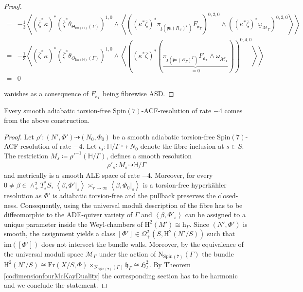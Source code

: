 \documentclass[psamsfonts]{amsart}
\theoremstyle{plain}
\theoremstyle{definition}{
\newtheorem{defi}{Definition}[section]
\newtheorem{ass}{Assumption}
\newtheorem*{nota}{Notation}}
\theoremstyle{remark}{
\newtheorem{rem}{Remark}
\newtheorem{ex}{Example}}
\theoremstyle{plain}{
\newtheorem{thm}{Theorem}[section]
\newtheorem{lem}{Lemma}[section]
\newtheorem{cor}{Corollary}[section]
\newtheorem{prop}{Proposition}[section]
\newtheorem{con}{Conjecture}[section]}
\newcommand{\m}[1]{{\mathrm{#1}}}
\begin{document}
\begin{proof}
\begin{align*}
    =&-\frac{1}{3}\left<(\overline{\zeta}^*\kappa)^*(\overline{\zeta}^*\theta_{\Theta_{\m{Im}(\mathbb{H})}(\Gamma)})^{1,0}\wedge\left<((\kappa^*\overline{\zeta})^*\pi_{\mathfrak{z}(\mathfrak{pu}(R_\Gamma)^{\Gamma})}F_{\mathfrak{a}_\Gamma})^{0,2,0}\wedge((\kappa^*\overline{\zeta})^*\underline{\omega}_{\mathcal{M}_\Gamma})^{0,2,0}\right>\right>\\
    =&-\frac{1}{3}\left<(\overline{\zeta}^*\kappa)^*(\overline{\zeta}^*\theta_{\Theta_{\m{Im}(\mathbb{H})}(\Gamma)})^{1,0}\wedge\left<((\kappa^*\overline{\zeta})^*(\underbrace{\pi_{\mathfrak{z}(\mathfrak{pu}(R_\Gamma)^{\Gamma})}F_{\mathfrak{a}_\Gamma}\wedge\underline{\omega}_{\mathcal{M}_\Gamma}}_{=0}))^{0,4,0}\right>\right>\\
    =&0
\end{align*}

vanishes as a consequence of $F_{\mathfrak{a}_\Gamma}$ being fibrewise ASD.
\end{proof}

\begin{thm}
\label{alladiabaticresolutions}
    Every smooth adiabatic torsion-free $\m{Spin}(7)$-ACF-resolution of rate $-4$ comes from the above construction.
\end{thm}

\begin{proof}
    Let $\rho'\colon (N',\Phi')\dashrightarrow (N_0,\Phi_0)$ be a smooth adiabatic torsion-free $\m{Spin}(7)$-ACF-resolution of rate $-4$. Let $\iota_s\colon \mathbb{H}/\Gamma\hookrightarrow N_0$ denote the fibre inclusion at $s\in S$. The restriction $M_s\coloneqq \rho'^{-1}(\mathbb{H}/\Gamma)$, defines a smooth resolution 
    \begin{align*}
        \rho'_s\colon M_s\dashrightarrow \mathbb{H}/\Gamma
    \end{align*}
    and metrically is a smooth ALE space of rate $-4$. Moreover, for every $0\neq \beta\in \wedge^2_+T^*_sS$, $\left<\beta,\Phi'|_{s}\right>\asymp_{r\to \infty} \left<\beta,\Phi_0|_{s}\right>$ is a torsion-free hyperkähler resolution as $\Phi'$ is adiabatic torsion-free and the pullback preserves the closed-ness. Consequently, using the universal moduli description of \cite{kronheimer1989construction} the fibre has to be diffeomorphic to the ADE-quiver variety of $\Gamma$ and $\left<\beta,\Phi'_s\right>$ can be assigned to a unique parameter inside the Weyl-chambers of $\m{H}^2(M')\cong \m{h}_\Gamma$. Since $(N',\Phi')$ is smooth, the assignment yields a class $[\Phi']\in \Omega^2_+(S,\m{H}^2(N'/S))$ such that $\m{im}([\Phi'])$ does not intersect the bundle walls. Moreover, by the equivalence of the universal moduli space $\mathcal{M}_\Gamma$ under the action of $\m{N}_{\m{Spin}(7)}(\Gamma)$ the bundle $\m{H}^2(N'/S)\cong \m{Fr}(X/S,\Phi)\times_{\m{N}_{\m{Spin}(7)}(\Gamma)} \mathfrak{h}_\Gamma\cong \mathfrak{H}^2_\Gamma$. By Theorem \ref{codimensionfourMcKayDuality} the corresponding section has to be harmonic and we conclude the statement.
\end{proof}
\end{document}
